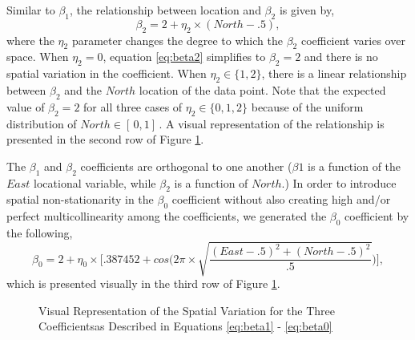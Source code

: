 \documentclass{article}\usepackage[]{graphicx}\usepackage[]{color}
\begin{document}
Similar to $\beta _1$, the relationship between location and $\beta _2$ is given by,
\begin{equation}\label{eq:beta2}
\beta _2 =  2 + \eta _2 \times (North- .5),
\end{equation}
where the $\eta _2$ parameter changes the degree to which the $\beta _2$ coefficient varies over space. When $\eta _2 =0$, equation \eqref{eq:beta2} simplifies to $\beta _2 =2$ and there is no spatial variation in the coefficient. When $\eta _2 \in \{1, 2\}$, there is a linear relationship between $\beta _2$ and the $North$ location of the data point. Note that the expected value of $\beta _2 = 2$ for all three cases of $\eta _2 \in \{0, 1, 2\}$ because of the uniform distribution of $North \in [\, 0, 1]\,$. A visual representation of the relationship is presented in the second row of Figure \ref{fig:spvarBeta}.

The $\beta _1$ and $\beta _2$ coefficients are orthogonal to one another ($\beta 1$ is a function of the $East$ locational variable, while $\beta _2$ is a function of $North$.) In order to introduce spatial non-stationarity in the $\beta _0$ coefficient without also creating high and/or perfect multicollinearity among the coefficients, we generated the $\beta _0$ coefficient by the following,
\begin{equation}\label{eq:beta0}
\beta _0 = 2 + \eta _0 \times \Bigg[.387452 + cos\Bigg(2\pi\times\sqrt{\frac{(East - .5)^2 + (North- .5)^2}{.5}}\Bigg)\Bigg],
\end{equation}
which is presented visually in the third row of Figure \ref{fig:spvarBeta}.


\begin{figure}
\caption{Visual Representation of the Spatial Variation for the Three Coefficientsas Described in Equations \eqref{eq:beta1} - \eqref{eq:beta0}}
\label{fig:spvarBeta}
\end{figure}
\end{document}
